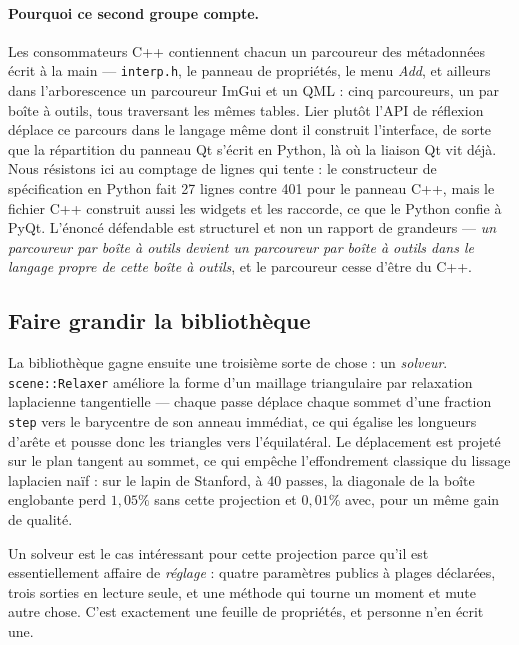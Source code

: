 \documentclass[11pt,a4paper]{article}
\newcommand{\code}[1]{\texttt{\small #1}}
\begin{document}
\paragraph{Pourquoi ce second groupe compte.} Les consommateurs C++ contiennent
chacun un parcoureur des métadonnées écrit à la main --- \code{interp.h}, le
panneau de propriétés, le menu \emph{Add}, et ailleurs dans l'arborescence un
parcoureur ImGui et un QML : cinq parcoureurs, un par boîte à outils, tous
traversant les mêmes tables. Lier plutôt l'API de réflexion déplace ce parcours
dans le langage même dont il construit l'interface, de sorte que la répartition
du panneau Qt s'écrit en Python, là où la liaison Qt vit déjà. Nous résistons ici
au comptage de lignes qui tente : le constructeur de spécification en Python fait
27 lignes contre 401 pour le panneau C++, mais le fichier C++ construit aussi les
widgets et les raccorde, ce que le Python confie à PyQt. L'énoncé défendable est
structurel et non un rapport de grandeurs --- \emph{un parcoureur par boîte à
outils devient un parcoureur par boîte à outils dans le langage propre de cette
boîte à outils}, et le parcoureur cesse d'être du C++.

\subsection{Faire grandir la bibliothèque}

La bibliothèque gagne ensuite une troisième sorte de chose : un \emph{solveur}.
\code{scene::Relaxer} améliore la forme d'un maillage triangulaire par relaxation
laplacienne tangentielle --- chaque passe déplace chaque sommet d'une fraction
\code{step} vers le barycentre de son anneau immédiat, ce qui égalise les
longueurs d'arête et pousse donc les triangles vers l'équilatéral. Le déplacement
est projeté sur le plan tangent au sommet, ce qui empêche l'effondrement
classique du lissage laplacien naïf : sur le lapin de Stanford, à 40 passes, la
diagonale de la boîte englobante perd $1{,}05\%$ sans cette projection et
$0{,}01\%$ avec, pour un même gain de qualité.

Un solveur est le cas intéressant pour cette projection parce qu'il est
essentiellement affaire de \emph{réglage} : quatre paramètres publics à plages
déclarées, trois sorties en lecture seule, et une méthode qui tourne un moment et
mute autre chose. C'est exactement une feuille de propriétés, et personne n'en
écrit une.
\end{document}
